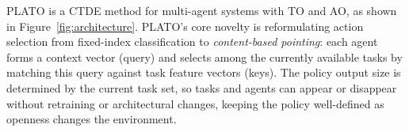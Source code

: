 

PLATO is a CTDE method for multi-agent systems with TO and AO, as shown in Figure~\ref{fig:architecture}. PLATO's core novelty is reformulating action selection from fixed-index classification to \emph{content-based pointing}: each agent forms a context vector (query) and selects among the currently available tasks by matching this query against task feature vectors (keys). The policy output size is determined by the current task set, so tasks and agents can appear or disappear without retraining or architectural changes, keeping the policy well-defined as openness changes the environment. %





